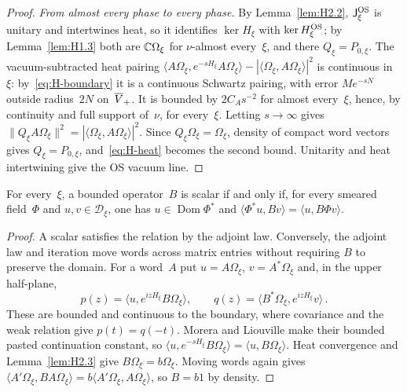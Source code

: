 \begin{proof}
\emph{From almost every phase to every phase.} By Lemma~\ref{lem:H2.2}, $\mathsf J^{\rm OS}_\xi$ is unitary and intertwines heat, so it identifies $\ker H_\xi$ with $\ker H^{\rm OS}_\xi$; by Lemma~\ref{lem:H1.3} both are $\mathbb{C}\Omega_\xi$ for $\nu$-almost every~$\xi$, and there $Q_\xi=P_{0,\xi}$. The vacuum-subtracted heat pairing $\langle A\Omega_\xi,e^{-sH_\xi}A\Omega_\xi\rangle-|\langle\Omega_\xi,A\Omega_\xi\rangle|^2$ is continuous in~$\xi$: by~\eqref{eq:H-boundary} it is a continuous Schwartz pairing, with error $Me^{-sN}$ outside radius~$2N$ on~$\overline{V}_+$. It is bounded by $2C_As^{-2}$ for almost every~$\xi$, hence, by continuity and full support of~$\nu$, for every~$\xi$. Letting $s\to\infty$ gives $\|Q_\xi A\Omega_\xi\|^2=|\langle\Omega_\xi,A\Omega_\xi\rangle|^2$. Since $Q_\xi\Omega_\xi=\Omega_\xi$, density of compact word vectors gives $Q_\xi=P_{0,\xi}$, and~\eqref{eq:H-heat} becomes the second bound. Unitarity and heat intertwining give the OS vacuum line.
\end{proof}

\begin{lemma}[Irreducibility]\label{lem:H-irreducible}
For every~$\xi$, a bounded operator~$B$ is scalar if and only if, for every smeared field~$\Phi$ and $u,v\in\mathcal D_\xi$, one has $u\in\operatorname{Dom}\Phi^*$ and $\langle\Phi^*u,Bv\rangle=\langle u,B\Phi v\rangle$.
\end{lemma}
\begin{proof}
A scalar satisfies the relation by the adjoint law. Conversely, the adjoint law and iteration move words across matrix entries without requiring $B$ to preserve the domain. For a word~$A$ put $u=A\Omega_\xi$, $v=A^*\Omega_\xi$ and, in the upper half-plane,
\begin{equation*}
p(z)=\langle u,e^{izH_\xi}B\Omega_\xi\rangle,\qquad
q(z)=\langle B^*\Omega_\xi,e^{izH_\xi}v\rangle\,.
\end{equation*}
These are bounded and continuous to the boundary, where covariance and the weak relation give $p(t)=q(-t)$. Morera and Liouville make their bounded pasted continuation constant, so $\langle u,e^{-sH_\xi}B\Omega_\xi\rangle=\langle u,B\Omega_\xi\rangle$. Heat convergence and Lemma~\ref{lem:H2.3} give $B\Omega_\xi=b\Omega_\xi$. Moving words again gives $\langle A'\Omega_\xi,BA\Omega_\xi\rangle=b\langle A'\Omega_\xi,A\Omega_\xi\rangle$, so $B=b1$ by density.
\end{proof}

